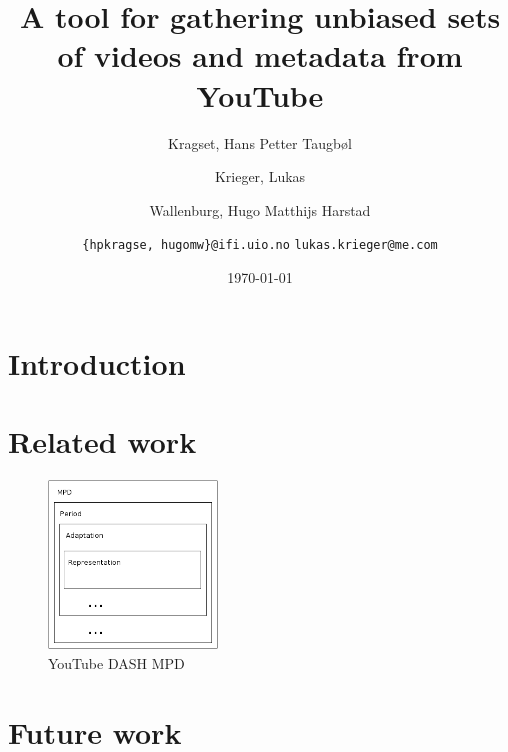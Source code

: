 \documentclass[10pt,journal]{IEEEtran}
\title{A tool for gathering unbiased sets of videos and metadata from YouTube}
\author{
	Kragset, Hans Petter Taugb\o l
	\and
	Krieger, Lukas
	\and
	Wallenburg, Hugo Matthijs Harstad
	\and
	\newline
	\texttt{\{hpkragse, hugomw\}@ifi.uio.no}
	\texttt{lukas.krieger@me.com}
}
\date{\today}
\begin{document}
\maketitle

\begin{abstract}
\end{abstract}

\section{Introduction}


\section{Related work}



\begin{figure}
	\centering
	\includegraphics[width=0.4\textwidth]{figures/yt-dash.png}
	\caption{YouTube DASH MPD}
\end{figure}











\section{Future work}





%

\end{document}
